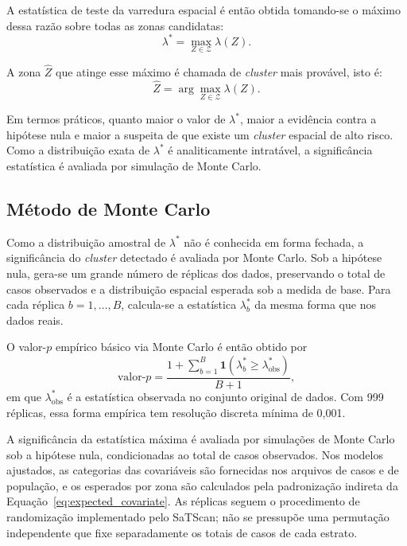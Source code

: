A estatística de teste da varredura espacial é então obtida tomando-se o máximo dessa razão sobre todas as zonas candidatas:
\begin{equation}
\lambda^\ast
=
\max_{Z\in\mathcal{Z}} \lambda(Z).
\label{eq:test_stat}
\end{equation}

A zona \(\widehat{Z}\) que atinge esse máximo é chamada de \textit{cluster} mais provável, isto é:
\begin{equation}
\widehat{Z}
=
\arg\max_{Z\in\mathcal{Z}} \lambda(Z).
\label{eq:most_likely_cluster}
\end{equation}

Em termos práticos, quanto maior o valor de \(\lambda^\ast\), maior a evidência contra a hipótese nula e maior a suspeita de que existe um \textit{cluster} espacial de alto risco. Como a distribuição exata de \(\lambda^\ast\) é analiticamente intratável, a significância estatística é avaliada por simulação de Monte Carlo.

\subsection{Método de Monte Carlo}

Como a distribuição amostral de \(\lambda^\ast\) não é conhecida em forma fechada, a significância do \textit{cluster} detectado é avaliada por Monte Carlo. Sob a hipótese nula, gera-se um grande número de réplicas dos dados, preservando o total de casos observados e a distribuição espacial esperada sob a medida de base. Para cada réplica \(b=1,\dots,B\), calcula-se a estatística \(\lambda_b^\ast\) da mesma forma que nos dados reais.

O valor-\(p\) empírico básico via Monte Carlo é então obtido por
\begin{equation}
\text{valor-}p
=
\frac{1+\sum_{b=1}^{B}\mathbf{1}\!\left(\lambda_b^\ast \geq \lambda^\ast_{\text{obs}}\right)}{B+1},
\label{eq:mc_pvalue}
\end{equation}
em que \(\lambda^\ast_{\text{obs}}\) é a estatística observada no conjunto original de dados. Com 999 réplicas, essa forma empírica tem resolução discreta mínima de 0,001.

A significância da estatística máxima é avaliada por simulações de Monte Carlo sob a hipótese nula, condicionadas ao total de casos observados. Nos modelos ajustados, as categorias das covariáveis são fornecidas nos arquivos de casos e de população, e os esperados por zona são calculados pela padronização indireta da Equação~\eqref{eq:expected_covariate}. As réplicas seguem o procedimento de randomização implementado pelo SaTScan; não se pressupõe uma permutação independente que fixe separadamente os totais de casos de cada estrato.

